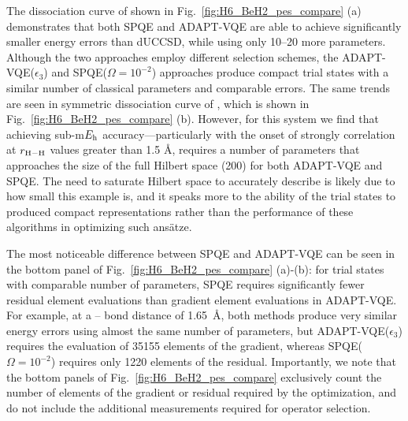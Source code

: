 \documentclass[aps,prx, reprint]{revtex4-2}
\newcommand*{\Eh}{$E_{\rm h}$\xspace}
\begin{document}
The dissociation curve of  shown in Fig.~\ref{fig:H6_BeH2_pes_compare} (a) demonstrates that both SPQE and ADAPT-VQE are able to achieve significantly smaller energy errors than dUCCSD, while using only 10--20 more parameters.
Although the two approaches employ different selection schemes, the ADAPT-VQE($\epsilon_3$) and SPQE($\Omega = 10^{-2}$) approaches produce compact trial states with a similar number of classical parameters and comparable errors.
The same trends are seen in symmetric dissociation curve of , which is shown in Fig.~\ref{fig:H6_BeH2_pes_compare} (b).
However, for this system we find that achieving sub-m\Eh accuracy---particularly with the onset of strongly correlation at $r_{\rm{H-H}}$ values greater than 1.5 \AA{}, requires a number of parameters that approaches the size of the full Hilbert space (200) for both ADAPT-VQE and SPQE.
The need to saturate Hilbert space to accurately describe  is likely due to how small this example is, and it speaks more to the ability of the trial states to produced compact representations rather than the performance of these algorithms in optimizing such ans\"{a}tze.

The most noticeable difference between SPQE and ADAPT-VQE can be seen in the bottom panel of Fig.~\ref{fig:H6_BeH2_pes_compare} (a)-(b): for trial states with comparable number of parameters, SPQE requires significantly fewer residual element evaluations than gradient element evaluations in ADAPT-VQE.
For example, at a -- bond distance of 1.65~\AA{}, both methods produce very similar energy errors using almost the same number of parameters, but ADAPT-VQE($\epsilon_3$) requires the evaluation of 35155 elements of the gradient, whereas SPQE($\Omega = 10^{-2}$) requires only 1220 elements of the residual.
Importantly, we note that the bottom panels of Fig.~\ref{fig:H6_BeH2_pes_compare} exclusively count the number of elements of the gradient or residual required by the optimization, and do not include the additional measurements required for operator selection.
\end{document}
